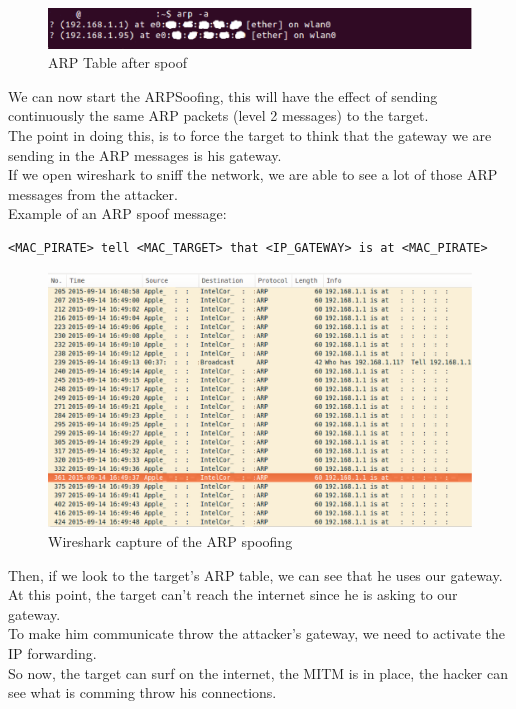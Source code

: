 \documentclass[a4paper, 11pt, oneside]{article}
\begin{document}
\begin{figure}[!h]
	\centering
	\includegraphics[scale=0.75]{../images/arpTableAfterSpoof.eps}
	\caption{ARP Table after spoof}
	\label{ARP_after_spoof}
\end{figure}
We can now start the ARPSoofing, this will have the effect of sending continuously the same ARP packets (level 2 messages) to the target.\\
The point in doing this, is to force the target to think that the gateway we are sending in the ARP messages is his gateway.\\
If we open wireshark to sniff the network, we are able to see a lot of those ARP messages from the attacker.\\

Example of an ARP spoof message: 
\begin{center}
\begin{verbatim}
<MAC_PIRATE> tell <MAC_TARGET> that <IP_GATEWAY> is at <MAC_PIRATE>
\end{verbatim}
\end{center}

\begin{figure}[!h]
	\centering
	\includegraphics[scale=0.3]{../images/wiresharArpSpoof.eps}
	\caption{Wireshark capture of the ARP spoofing}
	\label{Wireshark_ARP_Spoof}
\end{figure}

Then, if we look to the target's ARP table, we can see that he uses our gateway.\\
At this point, the target can't reach the internet since he is asking to our gateway.\\
To make him communicate throw the attacker's gateway, we need to activate the IP forwarding.\\
So now, the target can surf on the internet, the MITM is in place, the hacker can see what is comming throw his connections.\\
\end{document}
